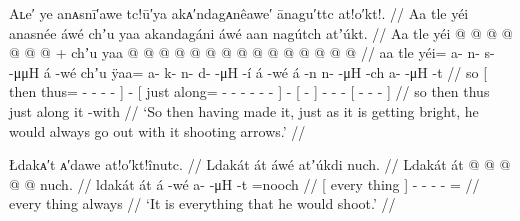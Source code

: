 \ex\label{ex:89-119-made-getting-bright-go-shooting}%
%
\begingl
	\glpreamble	Aʟe′ ye anᴀsnī′awe tc!ū′ya akᴀ′ndagᴀnêawe′ ānagu′ttc at!o′kt!. //
	\glpreamble	Aa tle yéi anasnée áwé chʼu yaa akandagáni áwé aan nagútch atʼúkt. //
	\gla	Aa {} tle yéi @  @ {} @ {} @ {} @ {} @ {} {}
		 @ {} +
		{} chʼu yaa @  @ {} @ {} @ {} @ {} @ {} @ {} {}
		 @ {}
		{}  @ {} {}
		 @ {} @ {} @ {}
		{}  @ {} @ {} @ {} {} //
	\glb	aa {} tle yéi= a- n- s-  -μμH {} {} á -wé
		{} chʼu ÿaa= a- k- n- d-  -μH -í {} á -wé
		{} á -n {}
		n-  -μH -ch
		{} a-  -μH -t {} {} //
	\glc	so {}[ then thus= - - -  - \· {}]
		 -
		{}[ just along= - - - -  - - {}]
		 -
		{}[  - {}]
		-  - -
		{}[ -  - - {}] //
	\gld	so {} then thus\•  {} {} {} {} {} {}
		 {}
		{} just along\•  {} {} {} {} {} {} {}
		 {}
		{} it -with {}
		 {} {} {}
		{}  {} {} {} {} //
	\glft	‘So then having made it, just as it is getting bright, he would always go out with it shooting arrows.’
		//
\endgl
\xe

\ex\label{ex:89-120-shoot-everything}%
%
\begingl
	\glpreamble	Łdakᴀ′t ᴀ′dawe at!o′kt!înutc. //
	\glpreamble	Ldakát át áwé atʼúkdi nuch. //
	\gla	{} Ldakát át {}  @ {}
		 @ {} @ {} @ {} @ \•nuch. //
	\glb	{} ldakát át {} á -wé
		a-  -μH -t =nooch //
	\glc	{}[ every thing {}]  -
		-  - - = //
	\gld	{} every thing {}  {}
		 {} {} {} {} \•always //
	\glft	‘It is everything that he would shoot.’
		//
\endgl
\xe

